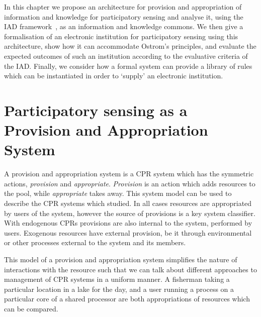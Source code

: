 In this chapter we propose an architecture for provision and appropriation of information and knowledge for participatory sensing and analyse it, using the \ac{IAD} framework~\citep{Ostrom2005}, as an information and knowledge commons.
We then give a formalisation of an electronic institution for participatory sensing using this architecture, show how it can accommodate Ostrom's principles,
and evaluate the expected outcomes of such an institution according to the evaluative criteria of the \ac{IAD}.
Finally, we consider how a formal system can provide a library of rules which can be instantiated in order to `supply' an electronic institution. 


\section{Participatory sensing as a Provision and Appropriation System}

A provision and appropriation system is a \ac{CPR} system which has the
symmetric actions, \emph{provision} and \emph{appropriate}. \emph{Provision}
is an action which adds resources to the pool, while \emph{appropriate} takes
away. This system model can be used to describe the \ac{CPR} systems which
\citet{Ostrom1990} studied. In all cases resources are appropriated by users
of the system, however the source of provisions is a key system classifier.
With endogenous \acp{CPR} provisions are also internal to the system,
performed by users. Exogenous resources have external provision, be it through
environmental or other processes external to the system and its members.

This model of a provision and appropriation system simplifies the nature of
interactions with the resource such that we can talk about different
approaches to management of \ac{CPR} systems in a uniform manner. A fisherman
taking a particular location in a lake for the day, and a user running a
process on a particular core of a shared processor are both appropriations of
resources which can be compared.

